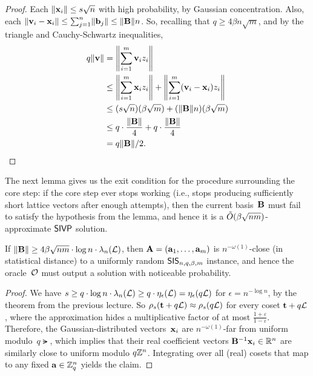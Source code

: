 \documentclass[11pt]{article}
\begin{document}
\begin{proof}
  Each $\length{\vecx_{i}} \leq s \sqrt{n}$ with high probability, by
  Gaussian concentration. Also, each
  $\length{\vecv_{i} - \vecx_{i}} \leq \sum_{j=1}^{n}
  \length{\vecb_{j}} \leq \length{\matB} n$. So, recalling that
  $q \geq 4\beta n\sqrt{m}$, and by the triangle and Cauchy-Schwartz
  inequalities,
  \begin{align*}
    q \length{\vecv}
    &= \length*{\sum_{i=1}^{m} \vecv_{i} z_{i}} \\
    &\leq \length*{\sum_{i=1}^{m} \vecx_{i}z_{i}} +
      \length*{\sum_{i=1}^{m} (\vecv_{i} - \vecx_{i})z_{i}} \\
    &\leq (s\sqrt{n}) (\beta \sqrt{m}) +
      (\length{\matB} n) (\beta \sqrt{m}) \\
    &\leq q \cdot \frac{\length{\matB}}{4} + q \cdot \frac{\length{\matB}}{4}\\
    &= q \length{\matB}/2.
  \end{align*}
\end{proof}

The next lemma gives us the exit condition for the procedure
surrounding the core step: if the core step ever stops working (i.e.,
stops producing sufficiently short lattice vectors after enough
attempts), then the current basis~$\matB$ must fail to satisfy the
hypothesis from the lemma, and hence it is a
$\Otil(\beta \sqrt{n m})$-approximate $\sivp$ solution.

\begin{lemma}
  \label{lem:sis-random}
  If
  $\length{\matB} \geq 4 \beta \sqrt{n m} \cdot \log n \cdot
  \lambda_{n}(\lat)$, then
  $\matA = \parens{\veca_{1}, \ldots, \veca_{m}}$ is
  $n^{-\omega(1)}$-close (in statistical distance) to a uniformly
  random $\sis_{n,q,\beta,m}$ instance, and hence the oracle~$\Ora$
  must output a solution with noticeable probability.
\end{lemma}

\begin{proof}
  We have
  $s \geq q \cdot \log n \cdot \lambda_{n}(\lat) \geq q \cdot
  \smootheps(\lat) = \smootheps(q \lat)$ for $\epsilon = n^{-\log n}$,
  by the theorem from the previous lecture. So
  $\rho_{s}\parens{\vect + q\lat} \approx \rho_{s}(q\lat)$ for every
  coset $\vect + q\lat$, where the approximation hides a
  multiplicative factor of at most
  $\frac{1+\varepsilon}{1-\varepsilon}$. Therefore, the
  Gaussian-distributed vectors~$\vecx_{i}$ are $n^{-\omega(1)}$-far
  from uniform modulo~$q\lat$, which implies that their real
  coefficient vectors $\matB^{-1} \vecx_{i} \in \R^{n}$ are similarly
  close to uniform modulo $q\Z^{n}$. Integrating over all (real)
  cosets that map to any fixed $\veca \in \Zq^{n}$ yields the claim.
\end{proof}
\end{document}
